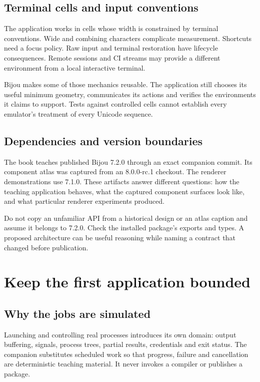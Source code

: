 \subsection{Terminal cells and input conventions}

The application works in cells whose width is constrained by terminal conventions. Wide and combining characters complicate measurement. Shortcuts need a focus policy. Raw input and terminal restoration have lifecycle consequences. Remote sessions and CI streams may provide a different environment from a local interactive terminal.

Bijou makes some of those mechanics reusable. The application still chooses its useful minimum geometry, communicates its actions and verifies the environments it claims to support. Tests against controlled cells cannot establish every emulator's treatment of every Unicode sequence.

\subsection{Dependencies and version boundaries}

The book teaches published Bijou 7.2.0 through an exact companion commit. Its component atlas was captured from an 8.0.0-rc.1 checkout. The renderer demonstrations use 7.1.0. These artifacts answer different questions: how the teaching application behaves, what the captured component surfaces look like, and what particular renderer experiments produced.

Do not copy an unfamiliar API from a historical design or an atlas caption and assume it belongs to 7.2.0. Check the installed package's exports and types. A proposed architecture can be useful reasoning while naming a contract that changed before publication.

\section{Keep the first application bounded}
\subsection{Why the jobs are simulated}

Launching and controlling real processes introduces its own domain: output buffering, signals, process trees, partial results, credentials and exit status. The companion substitutes scheduled work so that progress, failure and cancellation are deterministic teaching material. It never invokes a compiler or publishes a package.

